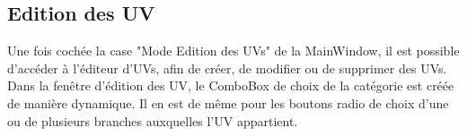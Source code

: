 \documentclass[a4paper,10pt,french]{report}
\begin{document}
        
	\subsection{Edition des UV}\label{subsec:IC}
    
		Une fois cochée la case "Mode Edition des UVs" de la MainWindow, il est possible d'accéder à l'éditeur d'UVs, afin de créer, de modifier ou de supprimer des UVs.\\
		Dans la fenêtre d'édition des UV, le ComboBox de choix de la catégorie est créée de manière dynamique.
		Il en est de même pour les boutons radio de choix d'une ou de plusieurs branches auxquelles l'UV appartient.
        

		
		
			\paragraph{}
			\paragraph{}
			\paragraph{}
		\subsubsection{}
			\paragraph{}
			\paragraph{}
			\paragraph{}
		\subsubsection{}
			\paragraph{}
			\paragraph{}
			\paragraph{}	
\end{document}
